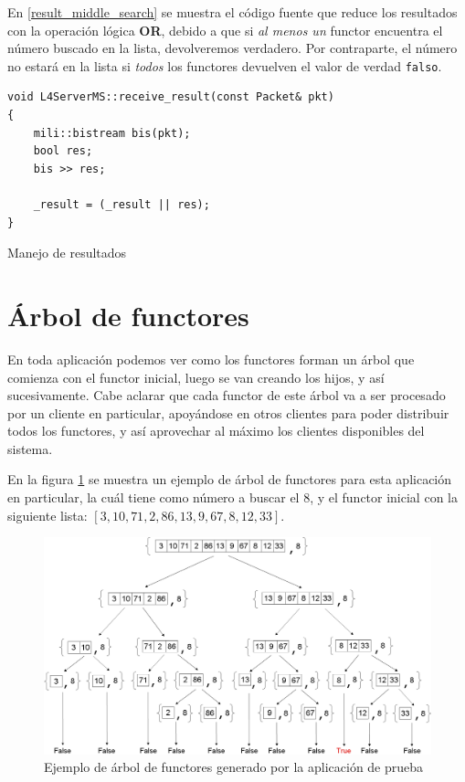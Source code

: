 En \ref{result_middle_search} se muestra el código fuente que reduce los resultados con la operación lógica \textbf{OR}, debido a que si
\textit{al menos un} functor encuentra el número buscado en la lista, devolveremos {verdadero}. Por contraparte, el número no estará en la
lista si \textit{todos} los functores devuelven el valor de verdad \texttt{falso}.

\begin{table}[ht]
    \lstset{language=C++}
    \begin{lstlisting}[frame=single]
void L4ServerMS::receive_result(const Packet& pkt)
{
    mili::bistream bis(pkt);
    bool res;
    bis >> res;

    _result = (_result || res);
}
    \end{lstlisting}
    \centering
    \caption{Manejo de resultados}
    \label{result_middle_search}
\end{table}


\section{Árbol de functores}
\label{functors_tree}

En toda aplicación podemos ver como los functores forman un árbol que comienza con el functor inicial, luego se van creando los hijos, y
así sucesivamente. Cabe aclarar que cada functor de este árbol va a ser procesado por un cliente en particular, apoyándose en otros
clientes para poder distribuir todos los functores, y así aprovechar al máximo los clientes disponibles del sistema.

En la figura \ref{middle_search_tree} se muestra un ejemplo de árbol de functores para esta aplicación en particular, la cuál tiene como
número a buscar el $8$, y el functor inicial con la siguiente lista: $[3, 10, 71, 2, 86, 13, 9, 67, 8, 12, 33]$.

\begin{center}
    \begin{landscape}
        \begin{figure}[ht]
            \includegraphics[scale=.37]{images/middle_search_tree.png}
            \caption{Ejemplo de árbol de functores generado por la aplicación de prueba}
            \label{middle_search_tree}
        \end{figure}
    \end{landscape}
\end{center}


